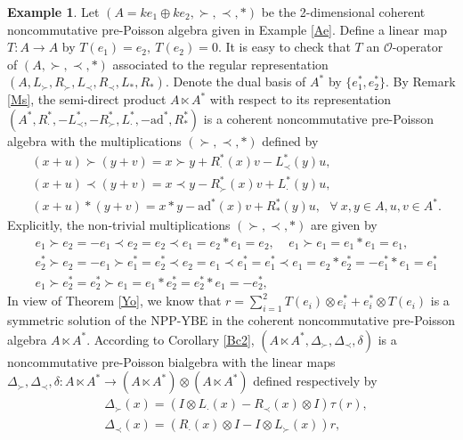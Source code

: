 \documentclass[12pt]{amsart}
\theoremstyle{definition}
\newtheorem{ex}[thm]{Example}
\begin{document}
\begin{ex} Let $(A=ke_1\oplus ke_2,\succ,\prec,\ast)$ be the 2-dimensional
 coherent noncommutative 
pre-Poisson algebra given in Example \ref{Ae}. Define a linear map $T:A\longrightarrow A$
by $T(e_1)=e_2,~T(e_2)=0$.
 It is easy to check that $T$ an $\mathcal{O}$-operator of $(A,\succ,\prec,\ast)$ 
 associated to the regular representation
$(A,L_{\succ},R_{\succ},L_{\prec},R_{\prec},L_{\ast},R_{\ast})$.
Denote the dual basis of $A^{*}$ by $\{e_1^{*}, e_2^{*}  \}$. 
By Remark \ref{Ms}, the semi-direct product 
$A\ltimes A^{*}$ with respect to its representation
$(A^{*},R_{\cdot}^{*},-L_{\prec}^{*},-R_{\succ}^{*},L_{\cdot}^{*},-\mathrm{ad}^{*},R^{*}_{\ast})$
is a coherent noncommutative pre-Poisson algebra with the multiplications $(\succ,\prec,\ast)$ defined by 
 \begin{align*}&
 (x+u)\succ (y+v)=x\succ y+R_{\cdot}^{*}(x)v-L_{\prec}^{*}(y)u, \\&
(x+u)\prec (y+v)=x\prec y-R_{\succ}^{*}(x)v+L_{\cdot}^{*}(y)u,\\&
(x+u)\ast (y+v)=x\ast y-\mathrm{ad}^{*}(x)v+R_{\ast}^{*}(y)u,
\ \ ~\forall~x,y\in A,u,v\in A^{*}.
	\end{align*}
 Explicitly, the non-trivial multiplications $(\succ,\prec,\ast)$ are given by 
 \begin{align*} &e_1\succ e_2=-e_1 \prec e_2=e_2\prec e_1=e_2\ast e_1=e_2,\ \ \ \ \ 
 e_1 \succ e_1=e_1\ast e_1=e_1,\\&
e_2^{*}\succ e_2=-e_1\succ e_1^{*}=e_2^{*}\prec e_2=e_1\prec e_1^{*}=e_1^{*}\prec e_1=e_2\ast e_2^{*}=-e_1^{*}\ast e_1=e_1^{*}
\\& e_1\succ e_2^{*}= e_2^{*}\succ e_1= e_1\ast e_2^{*}=e_2^{*}\ast e_1= -e_2^{*},
\end{align*}
In view of Theorem \ref{Yo}, we know that
 $r=\sum_{i =1}^{2}T(e_i)\otimes e_i^{*}+e_i^{*}\otimes T(e_i)$
 is a symmetric solution of the NPP-YBE in the coherent noncommutative pre-Poisson algebra $ A\ltimes A^{*} $. 
 According to Corollary \ref{Bc2}, 
$ (A\ltimes A^{*}, \Delta_{\succ}, \Delta_{\prec},\delta)$ is a noncommutative pre-Poisson bialgebra with the linear maps
$\Delta_{\succ}, \Delta_{\prec},\delta:A\ltimes A^{*}\longrightarrow (A\ltimes A^{*})\otimes (A\ltimes A^{*})$ defined respectively by
 \begin{align*}&\Delta_{\succ}(x)=(I\otimes L_{\cdot}(x)-R_{\prec}(x)\otimes I)\tau(r),\\&
 \Delta_{\prec}(x)=(R_{\cdot}(x)\otimes I-I\otimes L_{\succ}(x))r,\\&

\end{align*}
\end{ex}
\end{document}
